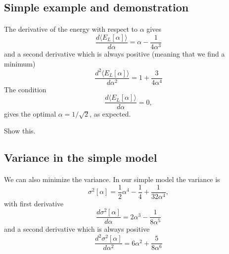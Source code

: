 \documentclass[%
twoside,                 %
final,                   %
10pt]{article}
\begin{document}
\subsection*{Simple example and demonstration}

\paragraph{}
The derivative of the energy with respect to $\alpha$ gives
\begin{equation*}
\frac{d\langle  E_L[\alpha]\rangle}{d\alpha} = \alpha-\frac{1}{4\alpha^3}
\end{equation*}
and a second derivative which is always positive (meaning that we find a minimum)
\begin{equation*}
\frac{d^2\langle  E_L[\alpha]\rangle}{d\alpha^2} = 1+\frac{3}{4\alpha^4}
\end{equation*}
The condition
\begin{equation*}
\frac{d\langle  E_L[\alpha]\rangle}{d\alpha} = 0,
\end{equation*}
gives the optimal $\alpha=1/\sqrt{2}$, as expected.


Show this.



\subsection*{Variance in the simple model}

\paragraph{}
We can also minimize the variance. In our simple model the variance is
\begin{equation*}
\sigma^2[\alpha] = \frac{1}{2}\alpha^4-\frac{1}{4}+\frac{1}{32\alpha^4},
\end{equation*}
with first derivative
\begin{equation*}
\frac{d \sigma^2[\alpha]}{d\alpha} = 2\alpha^3-\frac{1}{8\alpha^5}
\end{equation*}
and a second derivative which is always positive
\begin{equation*}
\frac{d^2\sigma^2[\alpha]}{d\alpha^2} = 6\alpha^2+\frac{5}{8\alpha^6}
\end{equation*}
\end{document}
